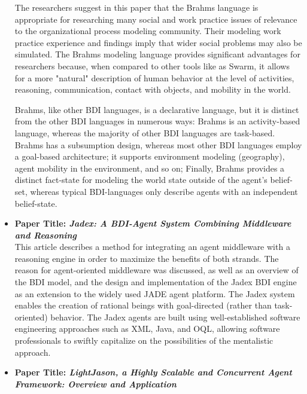 \begin{itemize}[label={}]
The researchers suggest in this paper \cite{brahms} that the Brahms language is appropriate for researching many social and work practice issues of relevance to the organizational process modeling community. Their modeling work practice experience and findings imply that wider social problems may also be simulated. The Brahms modeling language provides significant advantages for researchers because, when compared to other tools like as Swarm, it allows for a more "natural" description of human behavior at the level of activities, reasoning, communication, contact with objects, and mobility in the world.

\vspace{.5cm}

Brahms, like other \ac{BDI} languages, is a declarative language, but it is distinct from the other \ac{BDI} languages in numerous ways:
Brahms is an activity-based language, whereas the majority of other \ac{BDI} languages are task-based. Brahms has a subsumption design, whereas most other \ac{BDI} languages employ a goal-based architecture; it supports environment modeling (geography), agent mobility in the environment, and so on; Finally, Brahms provides a distinct fact-state for modeling the world state outside of the agent's belief-set, whereas typical \ac{BDI}-languages only describe agents with an independent belief-state.

\vspace{.5cm}

\item \textbf{Paper Title: \textit{Jadex: A \ac{BDI}-Agent System Combining Middleware and Reasoning}}\\

This article \cite{jadex} describes a method for integrating an agent middleware with a reasoning engine in order to maximize the benefits of both strands. The reason for agent-oriented middleware was discussed, as well as an overview of the \ac{BDI} model, and the design and implementation of the Jadex \ac{BDI} engine as an extension to the widely used JADE agent platform. The Jadex system enables the creation of rational beings with goal-directed (rather than task-oriented) behavior. The Jadex agents are built using well-established software engineering approaches such as XML, Java, and OQL, allowing software professionals to swiftly capitalize on the possibilities of the mentalistic approach.

\newpage

\item \textbf{Paper Title: \textit{LightJason, a Highly Scalable and Concurrent Agent Framework: Overview and Application}}\\


\end{itemize}
